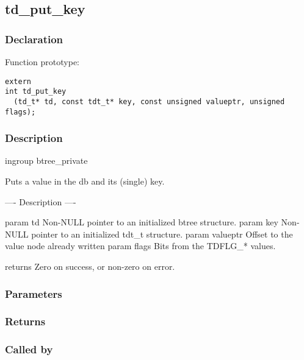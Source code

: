 
\newpage
\subsection{td\_put\_key}
\subsubsection{Declaration} Function prototype:

\begin{verbatim}
extern
int td_put_key
  (td_t* td, const tdt_t* key, const unsigned valueptr, unsigned flags);
\end{verbatim}

\subsubsection{Description}


 ingroup btree\_private

 Puts a value in the db and its (single) key.
 
 ---- Description ----

 param td Non-NULL pointer to an initialized btree structure.
 param key Non-NULL pointer to an initialized tdt\_t structure.
 param valueptr Offset to the value node already written
 param flags Bits from the TDFLG\_* values.

 returns Zero on success, or non-zero on error.
 

\subsubsection{Parameters}
\subsubsection{Returns}
\subsubsection{Called by}
